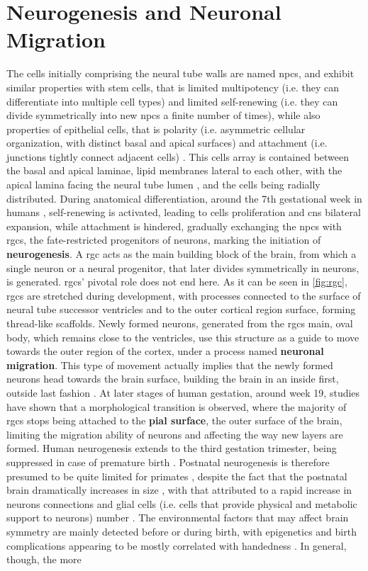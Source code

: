 \section{Neurogenesis and Neuronal Migration}
The cells initially comprising the neural tube walls are named \acp{npc}, and exhibit similar properties with stem cells, that is limited multipotency (i.e. they can differentiate into multiple cell types) and limited self-renewing (i.e. they can divide symmetrically into new \acp{npc} a finite number of times), while also properties of epithelial cells, that is polarity (i.e. asymmetric cellular organization, with distinct basal and apical surfaces)  and attachment (i.e. junctions tightly connect adjacent cells) \cite{Gotz2005}. This cells array is contained between the basal and apical laminae, lipid membranes lateral to each other, with the apical lamina facing the neural tube lumen \cite{Aaku-Saraste1997}, and the cells being radially distributed. During anatomical differentiation, around the 7th gestational week in humans \cite{Nowakowski2016}, self-renewing is activated, leading to cells proliferation and \ac{cns} bilateral expansion, while attachment is hindered, gradually exchanging the \acp{npc} with \acp{rgc}, the fate-restricted progenitors of neurons, marking the initiation of \textbf{neurogenesis}\cite{Gotz2005}. A \ac{rgc} acts as the main building block of the brain, from which a single neuron or a neural progenitor, that later divides symmetrically in neurons, is generated. \Acp{rgc}' pivotal role does not end here. As it can be seen in \autoref{fig:rgc}, \acsp{rgc} are stretched during development, with processes connected to the surface of neural tube successor ventricles and to the outer cortical region surface, forming thread-like scaffolds. Newly formed neurons, generated from the \acsp{rgc} main, oval body, which remains close to the ventricles, use this structure as a guide to move towards the outer region of the cortex, under a process named \textbf{neuronal migration}\cite{Rakic2009}. This type of movement actually implies that the newly formed neurons head towards the brain surface, building the brain in an inside first, outside last fashion \cite{Molnar2019}. At later stages of human gestation, around week 19, studies have shown that a morphological transition is observed, where the majority of \acp{rgc} stops being attached to the \textbf{pial surface}, the outer surface of the brain, limiting the migration ability of neurons  \cite{Nowakowski2016} and affecting the way new layers are formed. Human neurogenesis extends to the third gestation trimester, being suppressed in case of premature birth \cite{Malik2013}. Postnatal neurogenesis is therefore presumed to be quite limited for primates \cite{Ernst2015}, despite the fact that the postnatal brain  dramatically increases in size , with that attributed to a rapid increase in neurons connections and glial cells (i.e. cells that provide physical and metabolic support to neurons) number \cite{Dyck2017}. The environmental factors that may affect brain symmetry are mainly detected before or during birth, with epigenetics and birth complications  appearing to be mostly correlated with handedness \cite{Schmitz2019,Cara2022}. In general, though, the more 